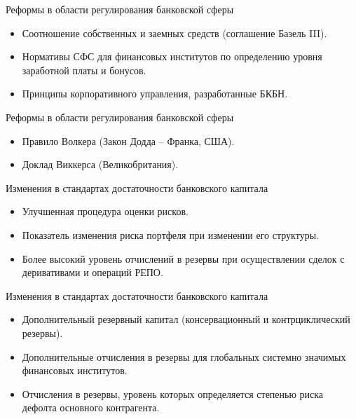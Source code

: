 \documentclass[_Banking_p1.tex]{subfiles}
\begin{document}
\begin{frame}{\setfontsize{12pt}Реформы в области регулирования банковской сферы}
\begin{itemize}[<+->]
\item
Соотношение собственных и заемных средств (соглашение Базель III).

\item
Нормативы СФС для финансовых институтов по определению уровня заработной платы и бонусов.

\item
Принципы корпоративного управления, разработанные БКБН.
\end{itemize}

\end{frame}
\begin{frame}{Реформы в области регулирования банковской сферы}
\begin{itemize}[<+->]
\item
Правило Волкера (Закон Додда – Франка, США).

\item
Доклад Виккерса (Великобритания).
\end{itemize}

\end{frame}


\begin{frame} {\setfontsize{12pt} Изменения в стандартах достаточности банковского капитала}
\begin{itemize}[<+->]

\item
Улучшенная процедура оценки рисков.

\item
Показатель изменения риска портфеля при изменении его структуры.

\item
Более высокий уровень отчислений в резервы при осуществлении сделок с деривативами и операций РЕПО.

\end{itemize}

\end{frame}
\begin{frame} {\setfontsize{12pt} Изменения в стандартах достаточности банковского капитала}
\begin{itemize}[<+->]
\item
Дополнительный резервный капитал (консервационный и контрциклический резервы).

\item
Дополнительные отчисления в резервы для глобальных системно значимых финансовых институтов.

\item
Отчисления в резервы, уровень которых определяется степенью риска дефолта основного контрагента.

\end{itemize}

\end{frame}
\end{document}
